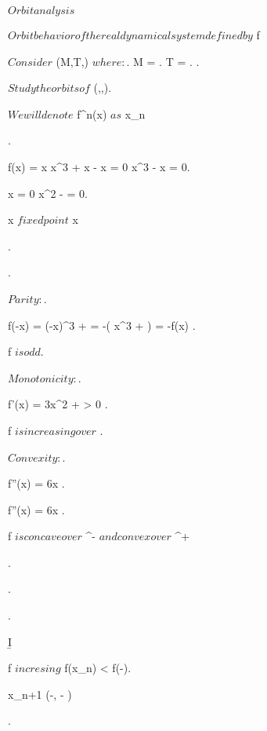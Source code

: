 \documentclass[../Main/main]{subfiles}
\begin{document}
\unit{ $ Orbit analysis $ }
{
	{
		{
		}
		\study
		{
			$Orbit behavior of the real dynamical system defined by $ f
		}
		\demonstration
		{
			{
				$Consider $ (M,T,\phi) $ where:$.
				M = \R.
				T = \N.
				.

				$Study the orbits of $ (\R,\N,\phi).
				
				$We will denote $ f^n(x) $ as $ x_n
			}.
			
			{
				{
					f(x) = x \ifandonlyif x^3 + x - x = 0 \ifandonlyif x^3 - x = 0.

				\ifandonlyif x = 0 \logicOr x^2 -  = 0.

				x $ fixed point $ \ifandonlyif x \in {}
				}.

			}.			


			{
				$ Parity:$.

				{
					f(-x) = (-x)^3 +  = -( x^3 + ) = -f(x)
				}.

				f $ is odd $.

				$ Monotonicity: $.

				{
					f'(x) = 3x^2 +  > 0
				}.

				f $ is increasing over $ \R.

				$ Convexity:$.

				{
					f''(x) = 6x 
				}.

				{
					f''(x) = 6x 
				}.

				f $ is concave over $ \R^- $ and convex over $ \R^+
			}.
			
			{
			
				.
			
			}.


			
			\b{I} 
			{
				{
					f $ incresing $ \imp f(x_n) < f(-).

					x_{n+1} \in (-\infty, - )
				}.

}}}}
\end{document}
